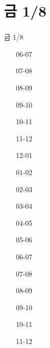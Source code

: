 \documentclass[aspectratio=1610,20pt,xcolor=pdftex,dvipsnames,table,handout]{beamer}
\begin{document}
	\section{금 1/8}
	\begin{frame} [t,plain]											
	\frametitle{}											
		\begin{block} {금 1/8}
		\setlength{\leftmargini}{3em}										
		\begin{itemize}										
			\item [06-07] \hrulefill									
			\item [07-08] \hrulefill									
			\item [08-09] \hrulefill									
			\item [09-10] \hrulefill									
			\item [10-11] \hrulefill									
			\item [11-12] \hrulefill									
			\item [12-01] \hrulefill									
			\item [01-02] \hrulefill									
			\item [02-03] \hrulefill									
			\item [03-04] \hrulefill									
			\item [04-05] \hrulefill									
			\item [05-06] \hrulefill									
			\item [06-07] \hrulefill									
			\item [07-08] \hrulefill									
			\item [08-09] \hrulefill									
			\item [09-10] \hrulefill									
			\item [10-11] \hrulefill									
			\item [11-12] \hrulefill									
		\end{itemize}										
		\end{block}										
	\end{frame}											
												
\end{document}
